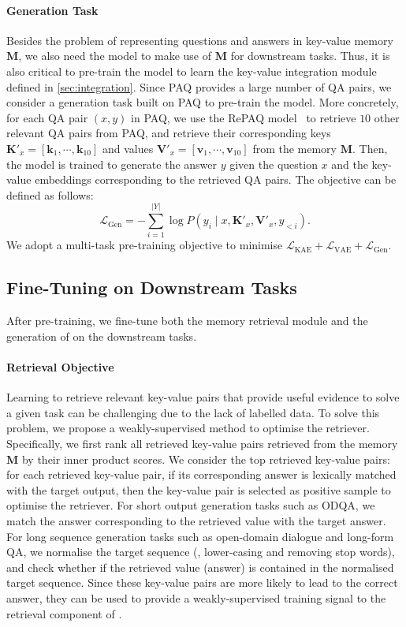 \paragraph{Generation Task}
Besides the problem of representing questions and answers in key-value memory $\mathbf{M}$, we also need the model to make use of $\mathbf{M}$ for downstream tasks. Thus, it is also critical to pre-train the model to learn the key-value integration module defined in \cref{sec:integration}.
Since PAQ provides a large number of QA pairs, we consider a generation task built on PAQ to pre-train the model.
More concretely, for each QA pair $(x, y)$ in PAQ, we use the RePAQ model~\citep{paq} to retrieve $10$ other relevant QA pairs from PAQ, and retrieve their corresponding keys $\mathbf{K}'_x = [\mathbf{k}_{1}, \cdots, \mathbf{k}_{10}]$ and values $\mathbf{V}'_x = [\mathbf{v}_{1}, \cdots, \mathbf{v}_{10}]$ from the memory $\mathbf{M}$.
Then, the model is trained to generate the answer $y$ given the question $x$ and the key-value embeddings corresponding to the retrieved QA pairs.
The objective can be defined as follows:
\begin{equation*}
\mathcal{L}_{\text{Gen}} = - \sum_{i=1}^{|Y|}  \log P(y_i \mid x, \mathbf{K}'_x, \mathbf{V}'_x, y_{<i}).
\end{equation*}
We adopt a multi-task pre-training objective to minimise $\mathcal{L}_{\text{KAE}} + \mathcal{L}_{\text{VAE}} + \mathcal{L}_{\text{Gen}}$.

\subsection{Fine-Tuning on Downstream Tasks} \label{sec:finetune}


After pre-training, we fine-tune both the memory retrieval module and the generation of \ModelName on the downstream tasks.


\paragraph{Retrieval Objective}
Learning to retrieve relevant key-value pairs that provide useful evidence to solve a given task can be challenging due to the lack of labelled data.
To solve this problem, we propose a weakly-supervised method to optimise the retriever.
Specifically, we first rank all retrieved key-value pairs retrieved from the memory $\mathbf{M}$ by their inner product scores. We consider the top retrieved key-value pairs: for each retrieved key-value pair, if its corresponding answer is lexically matched with the target output, then the key-value pair is selected as positive sample to optimise the retriever.
For short output generation tasks such as ODQA, we match the answer corresponding to the retrieved value with the target answer.
For long sequence generation tasks such as open-domain dialogue and long-form QA, we normalise the target sequence (\ie, lower-casing and removing stop words), and check whether if the retrieved value (answer) is contained in the normalised target sequence.
Since these key-value pairs are more likely to lead to the correct answer, they can be used to provide a weakly-supervised training signal to the retrieval component of \ModelName.



